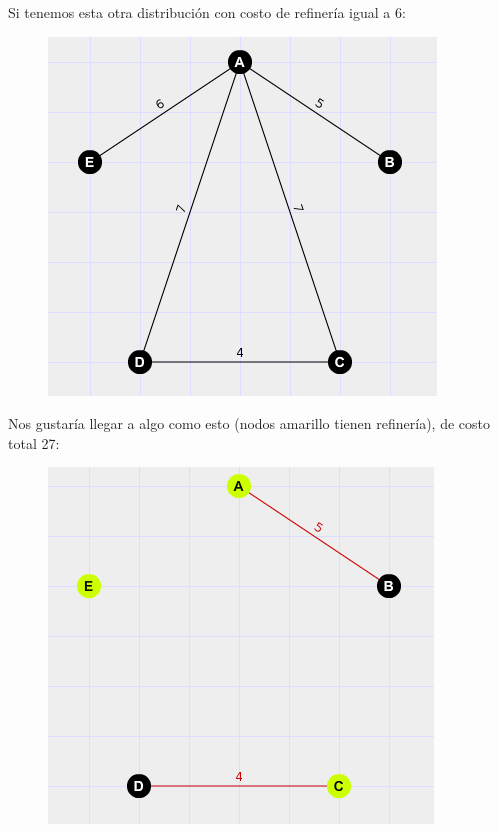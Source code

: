 	Si tenemos esta otra distribuci\'on con costo de refiner\'ia igual a 6:
	
  \begin{figure}[h!]
   \begin{center}
 	\includegraphics[scale=0.7]{imagenes/ej3/arbolCICLO.png}
   \end{center}
 \end{figure}
	
	Nos gustar\'ia llegar a algo como esto (nodos amarillo tienen refiner\'ia), de costo total 27:
	
  \begin{figure}[h!]
   \begin{center}
 	\includegraphics[scale=0.7]{imagenes/ej3/arbolLISTO.png}
   \end{center}
 \end{figure}

